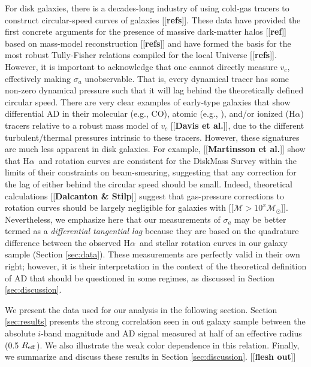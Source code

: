 \documentclass[apj,iop,revtex4,numberedappendix]{emulateapj}
\newcommand{\comment}[2][todo]{{\color{#1}[[{\bf #2}]]}}
\newcommand{\halpha}{H$\alpha$}
\begin{document}
For disk galaxies, there is a decades-long industry of using cold-gas
tracers to construct circular-speed curves of galaxies \comment{refs}.
These data have provided the first concrete arguments for the presence
of massive dark-matter halos \comment{ref} based on mass-model
reconstruction \comment{refs} and have formed the basis for the most
robust Tully-Fisher relations compiled for the local Universe
\comment{refs}.  However, it is important to acknowledge that one cannot
directly measure $v_c$, effectively making $\sigma_a$ unobservable.
That is, every dynamical tracer has some non-zero dynamical pressure
such that it will lag behind the theoretically defined circular speed.
There are very clear examples of early-type galaxies that show
differential AD in their molecular (e.g., CO), atomic (e.g.,
), and/or ionized (\halpha) tracers relative to a robust mass
model of $v_c$ \comment{Davis et al.}, due to the different
turbulent/thermal pressures intrinsic to these tracers.  However, these
signatures are much less apparent in disk galaxies.  For example,
\comment{Martinsson et al.} show that \halpha\ and  rotation
curves are consistent for the DiskMass Survey within the limits of their
constraints on beam-smearing, suggesting that any correction for the lag
of either behind the circular speed should be small.  Indeed,
theoretical calculations \comment{Dalcanton \& Stilp} suggest that
gas-pressure corrections to  rotation curves should be largely
negligible for galaxies with \comment{${\mathcal M} > 10^x {\mathcal
M}_\odot$}.  Nevertheless, we emphasize here that our measurements of
$\sigma_a$ may be better termed as a {\em differential tangential lag}
because they are based on the quadrature difference between the observed
\halpha\ and stellar rotation curves in our galaxy sample (Section
\ref{sec:data}).  These measurements are perfectly valid in their own
right; however, it is their interpretation in the context of the
theoretical definition of AD that should be questioned in some regimes,
as discussed in Section \ref{sec:discussion}.

We present the data used for our analysis in the following section.
Section \ref{sec:results} presents the strong correlation seen in out
galaxy sample between the absolute $i$-band magnitude and AD signal
measured at half of an effective radius (0.5 $R_{\rm eff}$).  We also
illustrate the weak color dependence in this relation.  Finally, we
summarize and discuss these results in Section \ref{sec:discussion}.
\comment{flesh out}
\end{document}
